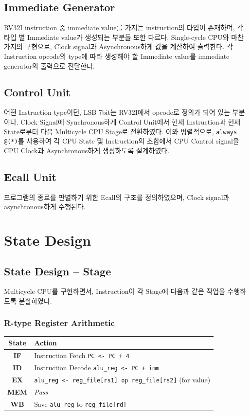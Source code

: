 \documentclass{scrartcl}
\begin{document}
\subsection{Immediate Generator}
RV32I instruction 중 immediate value를 가지는 instruction의 타입이 존재하며, 각 타입 별 Immediate value가
생성되는 부분들 또한 다르다. Single-cycle CPU와 마찬가지의 구현으로, Clock signal과 Asynchronous하게
값을 계산하여 출력한다. 각 Instruction opcode의 type에 따라 생성해야 할 Immediate value를
immediate generator의 출력으로 전달한다.

\subsection{Control Unit}
어떤 Instruction type이던, LSB 7bit는 RV32I에서 opcode로 정의가 되어 있는 부분이다. Clock Signal에 Synchronous하게
Control Unit에서 현재 Instruction과 현재 State로부터 다음 Multicycle CPU Stage로 전환하였다.
이와 병렬적으로, \texttt{always @(*)}를 사용하여 각 CPU State 및 Instruction의 조합에서 CPU Control signal을
CPU Clock과 Asynchronous하게 생성하도록 설계하였다.

\subsection{Ecall Unit}
프로그램의 종료를 판별하기 위한 Ecall의 구조를 정의하였으며, Clock signal과 asynchronous하게 수행된다.


\section{State Design}
\subsection{State Design -- Stage}
Multicycle CPU를 구현하면서, Instruction이 각 Stage에 다음과 같은 작업을 수행하도록 분할하였다.

\subsubsection{R-type Register Arithmetic}
\begin{tabularx}{\textwidth}{ | c | X | }
  \hline
  \textbf{State} & \textbf{Action} \\ \hline
  \textbf{IF} & Instruction Fetch \newline \texttt{PC <- PC + 4} \\ \hline
  \textbf{ID} & Instruction Decode \newline \texttt{alu\_reg <- PC + imm} \\ \hline
  \textbf{EX} & \texttt{alu\_reg <- reg\_file[rs1] op reg\_file[rs2]} (for value) \\ \hline
  \textbf{MEM} & \textit{Pass} \\ \hline
  \textbf{WB} & Save \texttt{alu\_reg} to \texttt{reg\_file[rd]} \\
  \hline
\end{tabularx}
\end{document}
